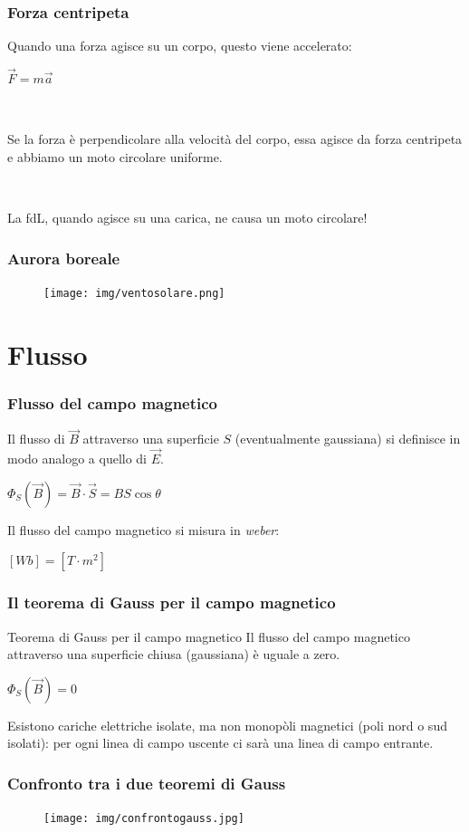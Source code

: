 \documentclass[]{beamer}
\theoremstyle{plain}
\begin{document}
\begin{frame}
\frametitle{Forza centripeta}
Quando una forza agisce su un corpo, questo viene accelerato: 
\begin{center}
$ \vec{F} = m\vec{a} $
\end{center}\pause

~

Se la forza è perpendicolare alla velocità del corpo, essa agisce da forza centripeta e abbiamo un \alert<2>{moto circolare uniforme}.
\begin{center}
\href{gif/centripeta.gif}{}
\end{center}\pause

~

\alert<3>{La fdL, quando agisce su una carica, ne causa un moto circolare!}
\begin{center}
\href{video/Motomagnetico.mp4}{}
\end{center}
\end{frame}


\begin{frame}
\frametitle{Aurora boreale}
\begin{figure}
\texttt{[image: img/ventosolare.png]}
\end{figure}
\end{frame}


\section{Flusso}

\begin{frame}
\frametitle{Flusso  del campo magnetico}
Il flusso di $ \vec{B} $ attraverso una superficie $ S $ (eventualmente gaussiana) si definisce in modo analogo a quello di $ \vec{E} $. 
\begin{center}
\colorbox{marroncino!30}{$ \Phi_{S}(\vec{B}) = \vec{B} \cdot \vec{S} = BS\cos\theta $}
\end{center}\pause
Il flusso del campo magnetico si misura in \emph{weber}:
\begin{center}
$ [Wb] = [T\cdot m^2] $
\end{center}
\end{frame}


\begin{frame}
\frametitle{Il teorema di Gauss per il campo magnetico}
\begin{block}{Teorema di Gauss per il campo magnetico}
Il flusso del campo magnetico attraverso una superficie chiusa (gaussiana) è uguale a zero.
\begin{center}
\colorbox{marroncino!30}{$ \Phi_S (\vec{B}) = 0 $}
\end{center}
\end{block}\pause
Esistono cariche elettriche isolate, ma non monopòli magnetici (poli nord o sud isolati): \alert{per ogni linea di campo uscente ci sarà una linea di campo entrante}.
\end{frame}


\begin{frame}
\frametitle{Confronto tra i due teoremi di Gauss}
\begin{figure}
\texttt{[image: img/confrontogauss.jpg]}
\end{figure}
\end{frame}
\end{document}
